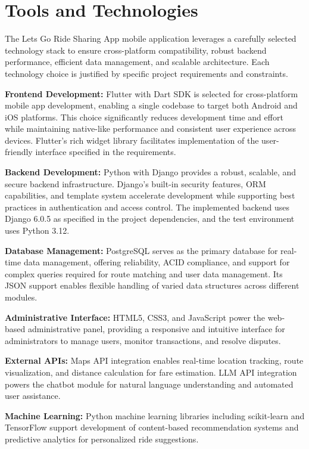 
\section{Tools and Technologies}

The Lets Go Ride Sharing App mobile application leverages a carefully selected technology stack to ensure cross-platform compatibility, robust backend performance, efficient data management, and scalable architecture. Each technology choice is justified by specific project requirements and constraints.

\textbf{Frontend Development:} Flutter with Dart SDK is selected for cross-platform mobile app development, enabling a single codebase to target both Android and iOS platforms. This choice significantly reduces development time and effort while maintaining native-like performance and consistent user experience across devices. Flutter's rich widget library facilitates implementation of the user-friendly interface specified in the requirements.

\textbf{Backend Development:} Python with Django provides a robust, scalable, and secure backend infrastructure. Django's built-in security features, ORM capabilities, and template system accelerate development while supporting best practices in authentication and access control. The implemented backend uses Django 6.0.5 as specified in the project dependencies, and the test environment uses Python 3.12.

\textbf{Database Management:} PostgreSQL serves as the primary database for real-time data management, offering reliability, ACID compliance, and support for complex queries required for route matching and user data management. Its JSON support enables flexible handling of varied data structures across different modules.

\textbf{Administrative Interface:} HTML5, CSS3, and JavaScript power the web-based administrative panel, providing a responsive and intuitive interface for administrators to manage users, monitor transactions, and resolve disputes.

\textbf{External APIs:} Maps API integration enables real-time location tracking, route visualization, and distance calculation for fare estimation. LLM API integration powers the chatbot module for natural language understanding and automated user assistance.

\textbf{Machine Learning:} Python machine learning libraries including scikit-learn and TensorFlow support development of content-based recommendation systems and predictive analytics for personalized ride suggestions.

